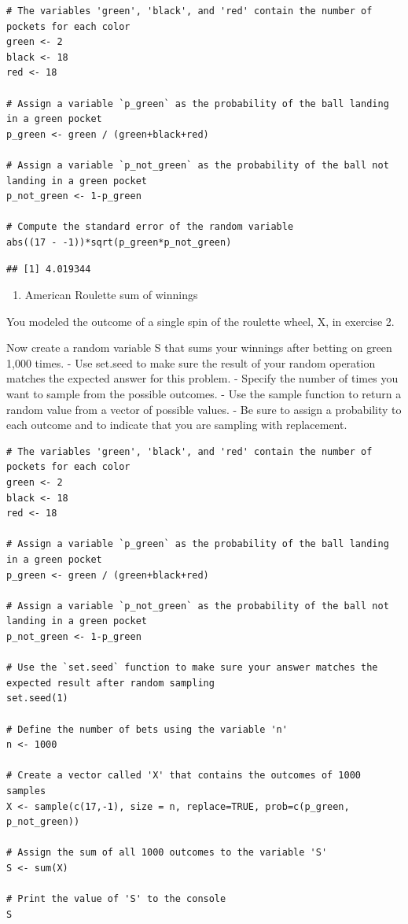 \documentclass[
]{article}
\providecommand{\tightlist}{%
  \setlength{\itemsep}{0pt}\setlength{\parskip}{0pt}}
\begin{document}
\begin{verbatim}
# The variables 'green', 'black', and 'red' contain the number of pockets for each color
green <- 2
black <- 18
red <- 18

# Assign a variable `p_green` as the probability of the ball landing in a green pocket
p_green <- green / (green+black+red)

# Assign a variable `p_not_green` as the probability of the ball not landing in a green pocket
p_not_green <- 1-p_green

# Compute the standard error of the random variable
abs((17 - -1))*sqrt(p_green*p_not_green)
\end{verbatim}

\begin{verbatim}
## [1] 4.019344
\end{verbatim}

\begin{enumerate}
\def\labelenumi{\arabic{enumi}.}
\setcounter{enumi}{4}
\tightlist
\item
  American Roulette sum of winnings
\end{enumerate}

You modeled the outcome of a single spin of the roulette wheel, X, in
exercise 2.

Now create a random variable S that sums your winnings after betting on
green 1,000 times. - Use set.seed to make sure the result of your random
operation matches the expected answer for this problem. - Specify the
number of times you want to sample from the possible outcomes. - Use the
sample function to return a random value from a vector of possible
values. - Be sure to assign a probability to each outcome and to
indicate that you are sampling with replacement.

\begin{verbatim}
# The variables 'green', 'black', and 'red' contain the number of pockets for each color
green <- 2
black <- 18
red <- 18

# Assign a variable `p_green` as the probability of the ball landing in a green pocket
p_green <- green / (green+black+red)

# Assign a variable `p_not_green` as the probability of the ball not landing in a green pocket
p_not_green <- 1-p_green

# Use the `set.seed` function to make sure your answer matches the expected result after random sampling
set.seed(1)

# Define the number of bets using the variable 'n'
n <- 1000

# Create a vector called 'X' that contains the outcomes of 1000 samples
X <- sample(c(17,-1), size = n, replace=TRUE, prob=c(p_green, p_not_green))

# Assign the sum of all 1000 outcomes to the variable 'S'
S <- sum(X)

# Print the value of 'S' to the console
S
\end{verbatim}
\end{document}
